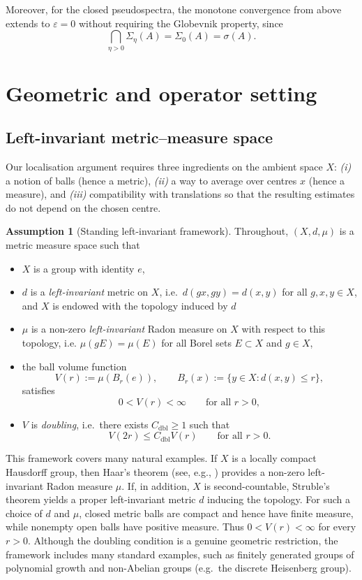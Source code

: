 \documentclass[11pt]{article}
\theoremstyle{definition}
\newtheorem{assumption}[theorem]{Assumption}
\begin{document}
Moreover, for the closed pseudospectra, the monotone convergence from above extends to $\varepsilon=0$ without requiring the Globevnik property, since
\[
    \bigcap_{\eta>0}\Sigma_\eta(A)
    = \Sigma_0(A)
    = \sigma(A).
\]




\section{Geometric and operator setting}

\subsection{Left-invariant metric--measure space}

Our localisation argument requires three ingredients on the ambient space $X$:
\emph{(i)} a notion of balls (hence a metric), \emph{(ii)} a way to average over
centres $x$ (hence a measure), and \emph{(iii)} compatibility with translations
so that the resulting estimates do not depend on the chosen centre.

\begin{assumption}[Standing left-invariant framework]\label{ass:standing}
Throughout, $(X,d,\mu)$ is a metric measure space such that
\begin{itemize}[leftmargin=2em]
\item $X$ is a group with identity $e$,
\item $d$ is a \emph{left-invariant} metric on $X$, i.e.\ $d(gx,gy)=d(x,y)$ for all $g,x,y\in X$, and $X$ is endowed with the topology induced by $d$
\item $\mu$ is a non-zero \emph{left-invariant} Radon measure on $X$ with respect to this topology, i.e. $\mu(gE)=\mu(E)$ for all Borel sets $E\subset X$ and $g\in X$,
\item the ball volume function
      \[
        V(r):=\mu(B_r(e)), \qquad B_r(x):=\{y\in X:d(x,y)\le r\},
      \]
      satisfies 
      \[
        0<V(r)<\infty \qquad\text{for all }r>0,
      \]
\item $V$ is \emph{doubling}, i.e.\ there exists $C_{\mathrm{dbl}}\ge1$ such that
      \[
        V(2r)\le C_{\mathrm{dbl}}V(r) \qquad\text{for all }r>0.
      \]
\end{itemize}
\end{assumption}

\medskip

This framework covers many natural examples. If $X$ is a locally
compact Hausdorff group, then Haar's theorem (see, e.g.,
\cite{folland95}) provides a non-zero left-invariant Radon measure
$\mu$. If, in addition, $X$ is second-countable, Struble's theorem
\cite{Struble1974} yields a proper left-invariant metric $d$ inducing
the topology. For such a choice of $d$ and $\mu$, closed metric balls
are compact and hence have finite measure, while nonempty open balls
have positive measure. Thus $0<V(r)<\infty$ for every $r>0$.
Although the doubling condition is a genuine geometric restriction,
the framework includes many standard examples, such as finitely
generated groups of polynomial growth and non-Abelian groups
(e.g.\ the discrete Heisenberg group).
\end{document}
